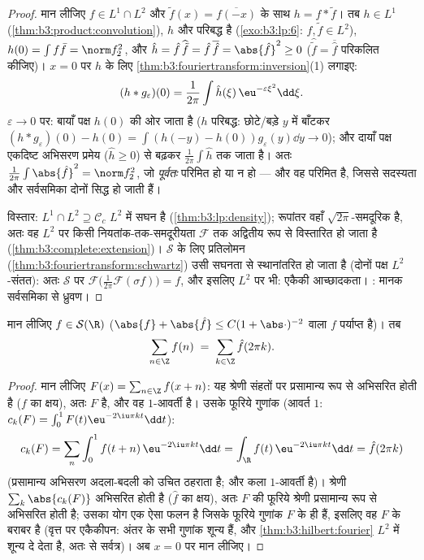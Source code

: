\begin{proof}
मान लीजिए $f \in L^1\cap L^2$ और $\tilde f(x) = \overline{f(-x)}$ के साथ $h = f * \tilde f$। तब $h \in L^1$ (\cref{thm:b3:product:convolution}), $h$
 और परिबद्ध है (\cref{exo:b3:lp:6}: $f, \tilde f \in L^2$), $h(0) =
\int f\bar f = \norm f_2^2$, और $\hat h = \hat
f\,\widehat{\tilde f} = \hat f\,\overline{\hat f} =
\abs{\hat f}^2 \geq 0$ ($\widehat{\tilde f} =
\overline{\hat f}$ परिकलित
कीजिए)। $x = 0$ पर $h$ के लिए \cref{thm:b3:fouriertransform:inversion}(1) लगाइए:
\[
(h * g_\varepsilon)(0) = \frac1{2\pi}\int \hat
h(\xi)\,\eu^{-\varepsilon\xi^2}\dd\xi .
\]
$\varepsilon \to 0$ पर: बायाँ पक्ष $h(0)$ की ओर जाता है ($h$  परिबद्ध:
छोटे/बड़े $y$ में बाँटकर $(h*g_\varepsilon)(0) - h(0) = \int(h(-y)
- h(0))g_\varepsilon(y)\dd y \to 0$); और दायाँ पक्ष एकदिष्ट अभिसरण
प्रमेय ($\hat h \geq 0$) से बढ़कर $\frac1{2\pi}\int\hat h$ तक जाता है। अतः $\frac1{2\pi}\int\abs{\hat f}^2 =
\norm f_2^2$, जो
\emph{पूर्वतः} परिमित हो या न हो --- और वह परिमित है, जिससे सदस्यता
और सर्वसमिका दोनों सिद्ध हो जाती हैं।

विस्तार: $L^1\cap L^2 \supseteq \mathcal C_c$ $L^2$ में सघन है (\cref{thm:b3:lp:density}); रूपांतर वहाँ
$\sqrt{2\pi}$-समदूरिक है, अतः वह $L^2$ पर किसी नियतांक-तक-समदूरीयता $\mathcal F$
तक अद्वितीय रूप से विस्तारित हो जाता है (\cref{thm:b3:complete:extension})। $\mathcal S$ के लिए
प्रतिलोमन (\cref{thm:b3:fouriertransform:schwartz}) उसी सघनता से स्थानांतरित हो जाता है (दोनों पक्ष
$L^2$-संतत): अतः $\mathcal S$ पर $\mathcal
F\bigl(\frac1{2\pi}\mathcal F(\sigma f)\bigr) = f$, और इसलिए $L^2$ पर भी: एकैकी
आच्छादकता। : मानक सर्वसमिका से ध्रुवण।
\end{proof}

\begin{theorem}[प्वासों योग]
\label{thm:b3:fouriertransform:poisson}
मान लीजिए $f \in \mathcal S(\R)$ ($\abs{f} +
\abs{\hat f} \leq C(1 + \abs\cdot)^{-2}$ वाला  $f$ पर्याप्त है)। तब
\[
\sum_{n\in\Z} f(n) \;=\; \sum_{k\in\Z}\hat f(2\pi k) .
\]
\end{theorem}

\begin{proof}
मान लीजिए $F(x) = \sum_{n\in\Z}f(x + n)$: यह श्रेणी संहतों पर प्रसामान्य रूप से अभिसरित
होती है ($f$ का क्षय), अतः $F$  है, और वह $1$-आवर्ती है।
उसके फूरिये गुणांक (आवर्त $1$: $c_k(F) = \int_0^1F(t)\eu^{-2\iu\pi kt}\dd t$):
\[
c_k(F) = \sum_n\int_0^1 f(t + n)\,\eu^{-2\iu\pi kt}\dd t
= \int_\R f(t)\,\eu^{-2\iu\pi kt}\dd t = \hat f(2\pi k)
\]
(प्रसामान्य अभिसरण अदला-बदली को उचित ठहराता है; और कला
$1$-आवर्ती है)। श्रेणी $\sum_k\abs{c_k(F)}$ अभिसरित होती है ($\hat f$ का क्षय),
अतः $F$ की फूरिये श्रेणी प्रसामान्य रूप से अभिसरित होती है;
उसका योग एक ऐसा  फलन है जिसके फूरिये गुणांक $F$ के ही हैं,
इसलिए वह $F$ के बराबर है (वृत्त पर एकैकीपन: अंतर के सभी गुणांक
शून्य हैं, और \cref{thm:b3:hilbert:fourier} $L^2$ में शून्य दे देता है, अतः  से
सर्वत्र)। अब $x = 0$ पर मान लीजिए।
\end{proof}

